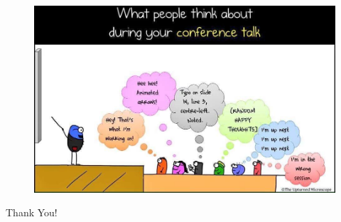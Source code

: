 \documentclass[xcolor=dvipsnames]{beamer}
\begin{document}
\begin{frame}
\frametitle{}
\begin{figure}[!htb]
\begin{center}
\includegraphics[scale=0.35]{./figures/questions.jpg}
\end{center}
\end{figure}
\begin{block}{}
\centering
Thank You!
\end{block}
\end{frame}

\end{document}

